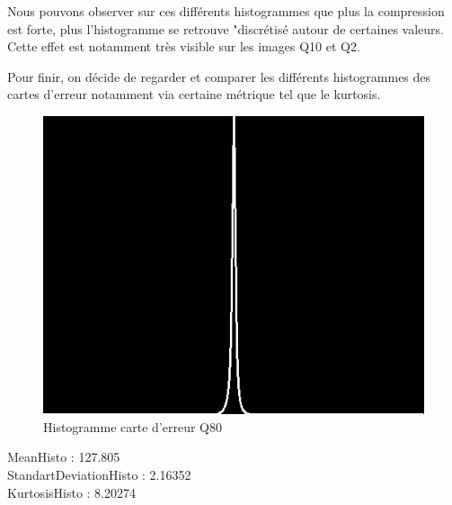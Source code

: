 \documentclass[12pt]{report}
\begin{document}
Nous pouvons observer sur ces différents histogrammes que plus la compression est forte, plus l'histogramme se retrouve "discrétisé autour de certaines valeurs. Cette effet est notamment très visible sur les images Q10 et Q2.

Pour finir, on décide de regarder et comparer les différents histogrammes des cartes d'erreur notamment via certaine métrique tel que le kurtosis.

\begin{figure}[H]
\begin{center}
\includegraphics[scale=0.5]{../ImageRes/hist_disto_1.jpg} 
\caption{Histogramme carte d'erreur Q80 }
\end{center}
\end{figure}

\begin{center}
MeanHisto : 127.805\\
StandartDeviationHisto : 2.16352\\
KurtosisHisto : 8.20274
\end{center}
\end{document}
